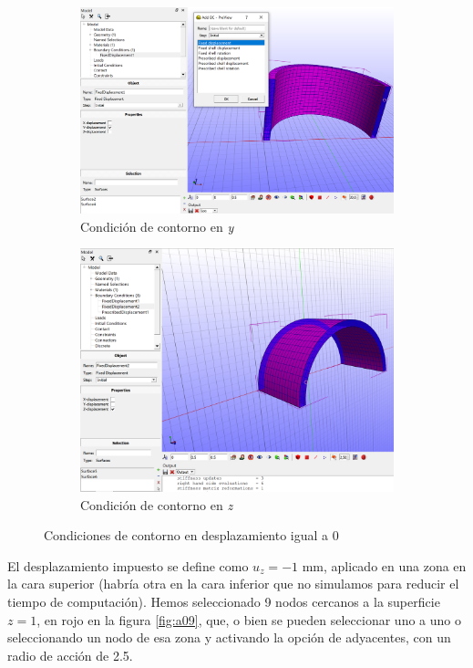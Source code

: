 \begin{figure}[!htp]
\centering
\begin{subfigure}[b]{0.48\textwidth}
\centering
\includegraphics[width=\textwidth]{figuras_3/a4.png}
\caption{Condición de contorno en \emph{y}}
\label{fig:a07}
\end{subfigure}
\begin{subfigure}[b]{0.48\textwidth}
\centering
\includegraphics[width=\textwidth]{figuras_3/a5.png}
\caption{Condición de contorno en \emph{z}}
\label{fig:a08}
\end{subfigure}
\caption{Condiciones de contorno en desplazamiento igual a 0}
\label{fig:a07-08}
\end{figure}

El desplazamiento impuesto se define como $u_{z}=-1$ mm, aplicado en una zona en la cara superior (habría otra en la cara inferior que no simulamos para reducir el tiempo de computación). Hemos seleccionado 9 nodos cercanos a la superficie $z=1$, en rojo en la figura \ref{fig:a09}, que, o bien se pueden seleccionar uno a uno o seleccionando un nodo de esa zona y activando la opción de adyacentes, con un radio de acción de 2.5. 

